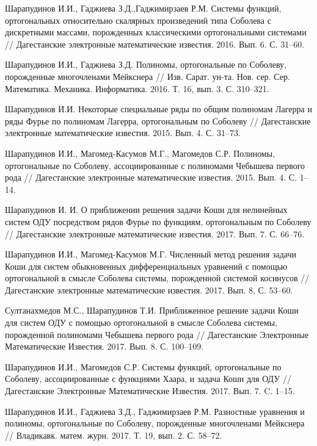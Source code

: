 \begin{thebibliography}{111}
Шарапудинов И.И., Гаджиева З.Д.,Гаджимирзаев Р.М. Системы функций, ортогональных относительно скалярных произведений типа Соболева с дискретными массами, порожденных классическими ортогональными системами // Дагестанские электронные математические известия. 2016. Вып. 6. С. 31--60.

Шарапудинов И.И., Гаджиева З.Д. Полиномы, ортогональные по Соболеву, порожденные многочленами Мейкснера // Изв. Сарат. ун-та. Нов. сер. Сер. Математика. Механика. Информатика. 2016. Т. 16, вып. 3. С. 310--321.

Шарапудинов И.И. Некоторые специальные ряды по общим полиномам Лагерра и ряды Фурье по полиномам Лагерра, ортогональным по Соболеву // Дагестанские электронные математические известия. 2015. Вып. 4. С. 31--73.

Шарапудинов И.И., Магомед-Касумов М.Г., Магомедов С.Р. Полиномы, ортогональные по Соболеву, ассоциированные с полиномами Чебышева первого рода // Дагестанские электронные математические известия. 2015. Вып. 4. С. 1--14.

Шарапудинов И. И. О приближении решения задачи Коши для нелинейных систем ОДУ посредством рядов Фурье по функциям, ортогональным по Соболеву // Дагестанские электронные математические известия. 2017. Вып. 7. С. 66--76.

Шарапудинов И.И., Магомед-Касумов М.Г. Численный метод решения задачи Коши для систем обыкновенных дифференциальных уравнений с помощью ортогональной в смысле Соболева системы, порожденной системой косинусов // Дагестанские электронные математические известия. 2017. Вып. 8, С. 53--60.

Султанахмедов М.С., Шарапудинов Т.И. Приближенное решение задачи Коши для систем ОДУ с помощью ортогональной в смысле Соболева системы, порожденной полиномами Чебышева первого рода // Дагестанские Электронные Математические Известия. 2017. Вып. 8. С. 100--109.

Шарапудинов И.И., Магомедов С.Р. Системы функций, ортогональные по Соболеву, ассоциированные с функциями Хаара, и задача Коши для ОДУ // Дагестанские Электронные Математические Известия. 2017. Вып. 7. C. 1--15.

Шарапудинов И.И., Гаджиева З.Д., Гаджимирзаев Р.М. Разностные уравнения и полиномы, ортогональные по Соболеву, порожденные многочленами Мейкснера // Владикавк. матем. журн. 2017. Т. 19, вып. 2. С. 58--72.


\end{thebibliography}
